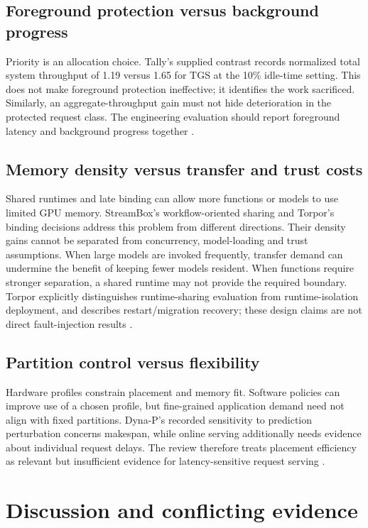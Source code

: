 \subsection{Foreground protection versus background progress}
Priority is an allocation choice. Tally's supplied contrast records normalized total system throughput of 1.19 versus 1.65 for TGS at the 10\% idle-time setting. This does not make foreground protection ineffective; it identifies the work sacrificed. Similarly, an aggregate-throughput gain must not hide deterioration in the protected request class. The engineering evaluation should report foreground latency and background progress together \cite{P022}.

\subsection{Memory density versus transfer and trust costs}
Shared runtimes and late binding can allow more functions or models to use limited GPU memory. StreamBox's workflow-oriented sharing and Torpor's binding decisions address this problem from different directions. Their density gains cannot be separated from concurrency, model-loading and trust assumptions. When large models are invoked frequently, transfer demand can undermine the benefit of keeping fewer models resident. When functions require stronger separation, a shared runtime may not provide the required boundary. Torpor explicitly distinguishes runtime-sharing evaluation from runtime-isolation deployment, and describes restart/migration recovery; these design claims are not direct fault-injection results \cite{P012,P013}.

\subsection{Partition control versus flexibility}
Hardware profiles constrain placement and memory fit. Software policies can improve use of a chosen profile, but fine-grained application demand need not align with fixed partitions. Dyna-P's recorded sensitivity to prediction perturbation concerns makespan, while online serving additionally needs evidence about individual request delays. The review therefore treats placement efficiency as relevant but insufficient evidence for latency-sensitive request serving \cite{P020}.

\section{Discussion and conflicting evidence}
